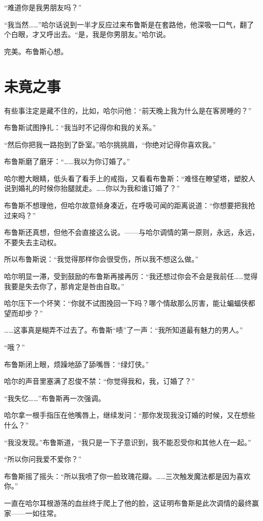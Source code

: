 \documentclass[../main.tex]{subfiles}
\begin{document}
“难道你是我男朋友吗？”

“我当然……”哈尔话说到一半才反应过来布鲁斯是在套路他，他深吸一口气，翻了个白眼，才又呼出去。“是，我是你男朋友。”哈尔说。

完美。布鲁斯心想。

\section{未竟之事}

有些事注定是藏不住的，比如，哈尔问他：“前天晚上我为什么是在客房睡的？”

布鲁斯试图挣扎：“我当时不记得你和我的关系。”

“然后你把我一路抱到了卧室。”哈尔挑挑眉，“你绝对记得你喜欢我。”

布鲁斯磨了磨牙：“……我以为你订婚了。”

哈尔瞪大眼睛，低头看了看手上的戒指，又看看布鲁斯：“难怪在瞭望塔，塑胶人说到婚礼的时候你抬腿就走。……你以为我和谁订婚了？”

布鲁斯不想理他，但哈尔故意倾身凑近，在呼吸可闻的距离说道：“你想要把我抢过来吗？”

布鲁斯还真想，但他不会直接这么说。——与哈尔调情的第一原则，永远，永远，不要失去主动权。

所以布鲁斯说：“我觉得那样你会很受伤，所以我不想这么做。”

哈尔明显一滞，受到鼓励的布鲁斯再接再厉：“我还想过你会不会是我前任……觉得我要是失去你了，那肯定是咎由自取。”

哈尔压下一个坏笑：“你就不试图挽回一下吗？哪个情敌那么厉害，能让蝙蝠侠都望而却步？”

……这事真是糊弄不过去了。布鲁斯“啧”了一声：“我所知道最有魅力的男人。”

“哦？”

布鲁斯闭上眼，烦躁地舔了舔嘴唇：“绿灯侠。”

哈尔的声音里塞满了忍俊不禁：“你觉得我和，我，订婚了？”

“我失忆……”布鲁斯再一次强调。

哈尔拿一根手指压在他嘴唇上，继续发问：“那你发现我没订婚的时候，又在想些什么？”

“我没发现。”布鲁斯道，“我只是一下子意识到，我不能忍受你和其他人在一起。”

“所以你问我爱不爱你？”

布鲁斯摇了摇头：“所以我喷了你一脸玫瑰花瓣。……三次触发魔法都是因为喜欢你。”

一直在哈尔耳根游荡的血丝终于爬上了他的脸，这证明布鲁斯是此次调情的最终赢家——一如往常。
\end{document}
